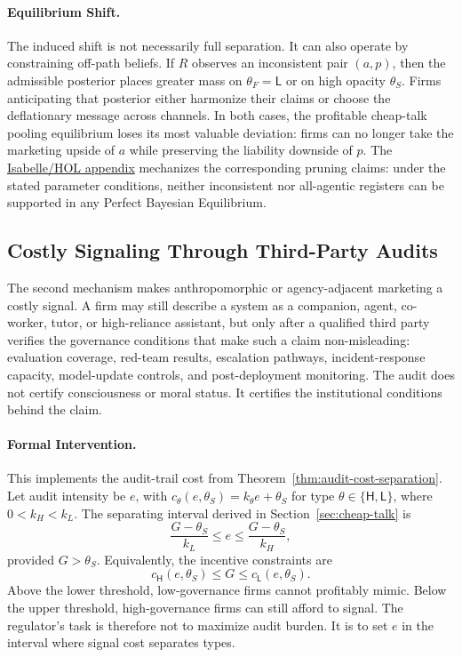 \documentclass[preprint,authoryear]{elsarticle}
\theoremstyle{definition}
\theoremstyle{plain}
\begin{document}
\paragraph{Equilibrium Shift.}
The induced shift is not necessarily full separation. It can also operate by
constraining off-path beliefs. If $R$ observes an inconsistent pair $(a,p)$,
then the admissible posterior places greater mass on $\theta_F=\mathsf{L}$ or
on high opacity $\theta_S$. Firms anticipating that posterior either harmonize
their claims or choose the deflationary message across channels. In both cases,
the profitable cheap-talk pooling equilibrium loses its most valuable deviation: firms can
no longer take the marketing upside of $a$ while preserving the liability
downside of $p$. The \hyperref[app:isabelle]{Isabelle/HOL appendix} mechanizes the corresponding pruning claims: under the stated parameter conditions, neither inconsistent nor all-agentic registers can be supported in any Perfect Bayesian Equilibrium.

\subsection{Costly Signaling Through Third-Party Audits}
\label{subsec:costly-signaling-audits}

The second mechanism makes anthropomorphic or agency-adjacent marketing a
costly signal. A firm may still describe a system as a companion, agent,
co-worker, tutor, or high-reliance assistant, but only after a qualified third
party verifies the governance conditions that make such a claim non-misleading:
evaluation coverage, red-team results, escalation pathways, incident-response
capacity, model-update controls, and post-deployment monitoring. The audit does
not certify consciousness or moral status. It certifies the institutional
conditions behind the claim.

\paragraph{Formal Intervention.}
This implements the audit-trail cost from Theorem~\ref{thm:audit-cost-separation}.
Let audit intensity be $e$, with $c_\theta(e,\theta_S)=k_\theta e+\theta_S$ for
type $\theta\in\{\mathsf{H},\mathsf{L}\}$, where $0<k_H<k_L$. The separating
interval derived in Section~\ref{sec:cheap-talk} is
\[
\frac{G-\theta_S}{k_L}\leq e\leq \frac{G-\theta_S}{k_H},
\]
provided $G>\theta_S$. Equivalently, the incentive constraints are
\[
c_\mathsf{H}(e,\theta_S)\leq G \leq c_\mathsf{L}(e,\theta_S).
\]
Above the lower threshold, low-governance firms cannot profitably mimic. Below
the upper threshold, high-governance firms can still afford to signal. The
regulator's task is therefore not to maximize audit burden. It is to set $e$ in
the interval where signal cost separates types.
\end{document}
